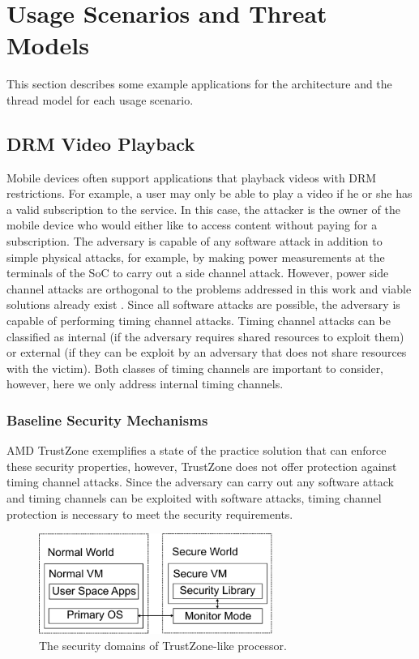 \section{Usage Scenarios and Threat Models}

    This section describes some example applications for the architecture and 
    the thread model for each usage scenario.

    \subsection{DRM Video Playback}
    Mobile devices often support applications that playback videos with
    DRM restrictions. For example, a user may only be able to play a video if 
    he or she has a valid subscription to the service. In this case, the 
    attacker is the owner of the mobile device who would either like to access 
    content without paying for a subscription. The adversary is capable of any 
    software attack in addition to simple physical attacks, for example, by 
    making power measurements at the terminals of the SoC to carry out a side 
    channel attack. However, power side channel attacks are orthogonal to the 
    problems addressed in this work and viable solutions already exist 
    \cite{needed}. Since all software attacks are possible, the adversary is 
    capable of performing timing channel attacks. Timing channel attacks can be 
    classified as internal (if the adversary requires shared resources to 
    exploit them) or external (if they can be exploit by an adversary that does 
    not share resources with the victim). Both classes of timing channels are 
    important to consider, however, here we only address internal timing 
    channels.

    \subsubsection{Baseline Security Mechanisms}
    AMD TrustZone \cite{trustzone} exemplifies a state of the practice solution 
    that can enforce these security properties, however, TrustZone does not 
    offer protection against timing channel attacks. Since the adversary can 
    carry out any software attack and timing channels can be exploited with 
    software attacks, timing channel protection is necessary to meet the 
    security requirements. 

    \begin{figure}
        \begin{center}
            \includegraphics[width=3in]{figs/worlds.pdf}
            \caption{The security domains of TrustZone-like processor.}
            \label{fig:tz_domains}
        \end{center}
    \end{figure}
    
